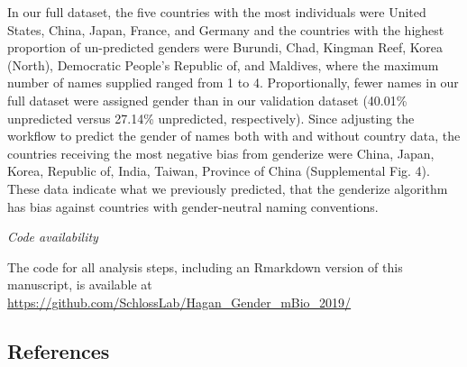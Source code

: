 \documentclass[11pt,]{article}
\begin{document}
In our full dataset, the five countries with the most individuals were
United States, China, Japan, France, and Germany and the countries with
the highest proportion of un-predicted genders were Burundi, Chad,
Kingman Reef, Korea (North), Democratic People's Republic of, and
Maldives, where the maximum number of names supplied ranged from 1 to 4.
Proportionally, fewer names in our full dataset were assigned gender
than in our validation dataset (40.01\% unpredicted versus 27.14\%
unpredicted, respectively). Since adjusting the workflow to predict the
gender of names both with and without country data, the countries
receiving the most negative bias from genderize were China, Japan,
Korea, Republic of, India, Taiwan, Province of China (Supplemental Fig.
4). These data indicate what we previously predicted, that the genderize
algorithm has bias against countries with gender-neutral naming
conventions.

\emph{Code availability}

The code for all analysis steps, including an Rmarkdown version of this
manuscript, is available at
\url{https://github.com/SchlossLab/Hagan_Gender_mBio_2019/}

\subsection{References}\label{references}
\end{document}
